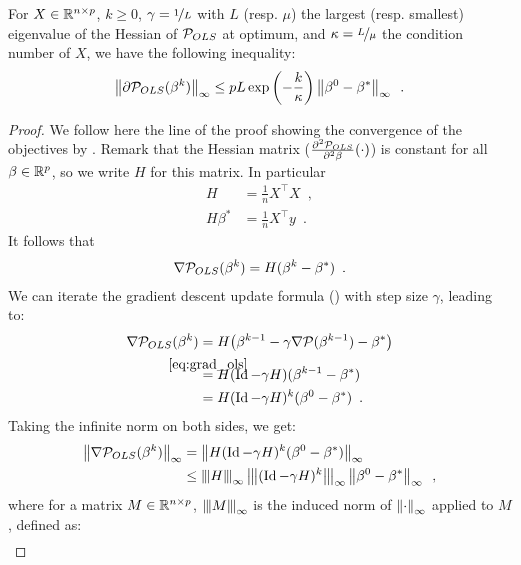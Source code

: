 \documentclass[../main.tex]{subfiles}
\begin{document}
\begin{proposition}\label{prop:ls_kkt}
    For $X\in\mathbb{R}^{n\times p}$, $k\geq 0$, $\gamma = \nicefrac{1}{L}$
    with $L$ (resp. $\mu$) the largest (resp. smallest) eigenvalue of
    the Hessian of $\mathcal{P}_{OLS}$ at optimum, and $\kappa=\nicefrac{L}{\mu}$ the condition
    number of $X$, we have the following inequality:
    \begin{align}
    \left \lVert \partial\mathcal{P}_{OLS}(\beta^k) \right \rVert_{\infty}
    \leq pL \exp\left(-\frac{k}{\kappa}\right) \left \lVert \beta^0 - \beta^* \right \rVert_\infty
    \enspace.
    \end{align}
\end{proposition}
\begin{proof}
We follow here the line of the proof showing the convergence of the objectives by \citep{Bachbook}.
Remark that the Hessian matrix ($\frac{\partial^2{\mathcal{P}_{OLS}}}{\partial^2 \beta}(\cdot)$)
is constant for all $\beta\in \mathbb{R}^p$, so we write $H$ for this matrix.
In particular
\begin{align}
    H & = \frac{1}{n}X^\top X\enspace, \\
    H\beta^* & = \frac{1}{n}X^\top y \enspace.
\end{align}
It follows that
\begin{align}\label{eq:grad_ols}
\nabla \mathcal{P}_{OLS}(\beta^k) = H(\beta^k - \beta^*) \enspace.
\end{align}
We can iterate the gradient descent update formula () with step size $\gamma$,
leading to:
\begin{align*}
    \nabla \cP_{OLS}(\beta^k)
     & = H\big(\beta^{k-1} - \gamma \nabla \cP(\beta^{k-1}) - \beta^*\big) \\
     & \stackrel{\mathmakebox[\widthof{=}]{{\ref{eq:grad_ols}}}}{=}  H(\Id - \gamma H) (\beta^{k-1} - \beta^*) \\
     & = H(\Id - \gamma H)^k (\beta^0 - \beta^*) \enspace.
\end{align*}
%
Taking the infinite norm on both sides, we get:
\begin{align*}
    \norm{\nabla \cP_{OLS}(\beta^k)}_\infty
    & = \norm{H(\Id - \gamma H)^k (\beta^0 - \beta^*)}_\infty \\
    & \leq \tnorm{H}_\infty \tnorm{(\Id - \gamma H)^k}_\infty \norm{\beta^0 - \beta^*}_\infty \enspace,
\end{align*}
where for a matrix $M\in\mathbb{R}^{n\times p}$, $\tnorm{M}_\infty$ is the induced norm
of $\left \lVert \cdot \right \rVert_\infty$ applied to $M$, defined as:
\begin{align*}

\end{align*}
\end{proof}
\end{document}
